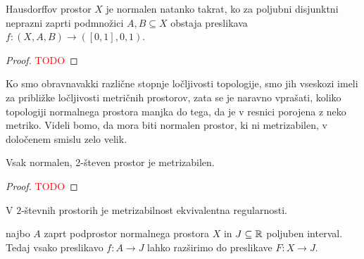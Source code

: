 \begin{izrek}
    Hausdorffov prostor $X$ je normalen natanko takrat, ko za poljubni disjunktni neprazni zaprti podmnožici $A, B \subseteq X$ obstaja preslikava $f :(X, A, B) \to ([0,1], 0, 1)$.
\end{izrek}

\begin{proof}
    \textcolor{red}{TODO}
\end{proof}

Ko smo obravnavakki različne stopnje ločljivosti topologije, smo jih vseskozi imeli za približke ločljivosti metričnih prostorov, zata se je naravno vprašati, koliko topologiji normalnega prostora manjka do tega, da je v resnici porojena z neko metriko. Videli bomo, da mora biti normalen prostor, ki ni metrizabilen, v določenem smislu zelo velik. 

\begin{izrek}
    Vsak normalen, 2-števen prostor je metrizabilen.
\end{izrek}

\begin{proof}
    \textcolor{red}{TODO}
\end{proof}

\begin{posledica}
    V $2$-števnih prostorih je metrizabilnost ekvivalentna regularnosti.
\end{posledica}

\begin{izrek}
    najbo $A$ zaprt podprostor normalnega prostora $X$ in $J \subseteq \mathbb{R}$ poljuben interval. Tedaj vsako preslikavo $f: A \to J$ lahko razširimo do preslikave $F: X \to J$.
\end{izrek}


